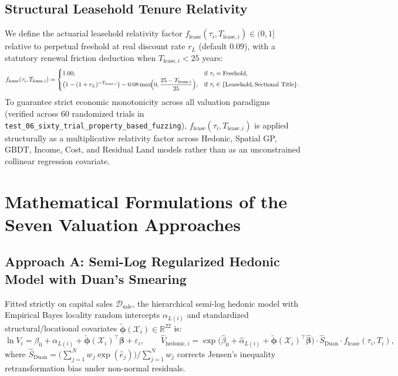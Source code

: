 \documentclass[11pt,a4paper]{article}
\begin{document}
\subsection{Structural Leasehold Tenure Relativity}
We define the actuarial leasehold relativity factor $f_{\text{lease}}(\tau_i, T_{\text{lease},i}) \in (0, 1]$ relative to perpetual freehold at real discount rate $r_L$ (default $0.09$), with a statutory renewal friction deduction when $T_{\text{lease},i} < 25$ years:
\begin{equation}
    f_{\text{lease}}(\tau_i, T_{\text{lease},i}) =
    \begin{cases}
        1.00, & \text{if } \tau_i = \text{Freehold}, \\
        \bigl(1 - (1 + r_L)^{-T_{\text{lease},i}}\bigr) - 0.08 \max\!\Bigl(0, \dfrac{25 - T_{\text{lease},i}}{25}\Bigr), & \text{if } \tau_i \in \{\text{Leasehold}, \text{Sectional Title}\}.
    \end{cases}
\end{equation}
To guarantee strict economic monotonicity across all valuation paradigms (verified across 60 randomized trials in \texttt{test\_06\_sixty\_trial\_property\_based\_fuzzing}), $f_{\text{lease}}(\tau_i, T_{\text{lease},i})$ is applied structurally as a multiplicative relativity factor across Hedonic, Spatial GP, GBDT, Income, Cost, and Residual Land models rather than as an unconstrained collinear regression covariate.

\section{Mathematical Formulations of the Seven Valuation Approaches}

\subsection{Approach A: Semi-Log Regularized Hedonic Model with Duan's Smearing}
Fitted strictly on capital sales $\mathcal{D}_{\text{sale}}$, the hierarchical semi-log hedonic model with Empirical Bayes locality random intercepts $\alpha_{L(i)}$ and standardized structural/locational covariates $\tilde{\boldsymbol{\phi}}(\mathcal{X}_i) \in \mathbb{R}^{22}$ is:
\begin{equation}
    \ln V_i = \beta_0 + \alpha_{L(i)} + \tilde{\boldsymbol{\phi}}(\mathcal{X}_i)^\top \boldsymbol{\beta} + \varepsilon_i, \qquad \hat{V}_{\text{hedonic},i} = \exp\bigl(\hat{\beta}_0 + \hat{\alpha}_{L(i)} + \tilde{\boldsymbol{\phi}}(\mathcal{X}_i)^\top \hat{\boldsymbol{\beta}}\bigr) \cdot \hat{S}_{\text{Duan}} \cdot f_{\text{lease}}(\tau_i, T_i),
\end{equation}
where $\hat{S}_{\text{Duan}} = \bigl(\sum_{j=1}^N w_j \exp(\hat{e}_j)\bigr) / \sum_{j=1}^N w_j$ corrects Jensen's inequality retransformation bias under non-normal residuals.
\end{document}
